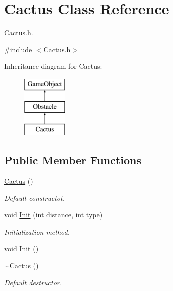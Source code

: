 \hypertarget{class_cactus}{}\section{Cactus Class Reference}
\label{class_cactus}


\mbox{\hyperlink{_cactus_8h}{Cactus.\+h}}.  




{\ttfamily \#include $<$Cactus.\+h$>$}

Inheritance diagram for Cactus\+:\begin{figure}[H]
\begin{center}
\leavevmode
\includegraphics[height=3.000000cm]{class_cactus}
\end{center}
\end{figure}
\subsection*{Public Member Functions}
\begin{DoxyCompactItemize}
\item 
\mbox{\hyperlink{class_cactus_a7af2b09f8e3efd82ee3d5dc1b5ad24d7}{Cactus}} ()
\begin{DoxyCompactList}\small\item\em Default constructot. \end{DoxyCompactList}\item 
void \mbox{\hyperlink{class_cactus_a44cd240a41740db3216ce9d18ea9a8aa}{Init}} (int distance, int type)
\begin{DoxyCompactList}\small\item\em Initialization method. \end{DoxyCompactList}\item 
void \mbox{\hyperlink{class_cactus_af1dc82bd652141aea55d65bde708856a}{Init}} ()
\item 
\mbox{\hyperlink{class_cactus_aad137061a9d2432ac47f4c28b23644c3}{$\sim$\+Cactus}} ()
\begin{DoxyCompactList}\small\item\em Default destructor. \end{DoxyCompactList}\end{DoxyCompactItemize}
